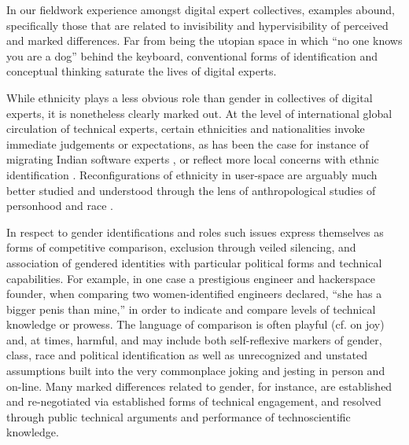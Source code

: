 \documentclass[10pt,letter,oneside]{scrartcl}
\begin{document}
In our fieldwork experience amongst digital expert collectives,
examples abound, specifically those that are related to invisibility
and hypervisibility of perceived and marked differences.  Far from
being the utopian space in which ``no one knows you are a dog'' behind
the keyboard, conventional forms of identification and conceptual thinking
saturate the lives of digital experts. 

While ethnicity plays a less obvious role than gender in collectives
of digital experts, it is nonetheless clearly marked out.  At the
level of international global circulation of technical experts,
certain ethnicities and nationalities invoke immediate judgements or
expectations, as has been the case for instance of migrating Indian software
experts \cite{xiang2007}, or reflect more local concerns with ethnic
identification \cite{Takhteyev2012,Burrell2012,Chan2013}.  Reconfigurations of
ethnicity in user-space are arguably much better studied and understood 
through the lens of anthropological studies of personhood and race \cite{BOELLSTORFF2008,Miller2011,Nakamura2013}.

In respect to gender identifications and roles such issues express 
themselves as forms of competitive comparison, exclusion through veiled 
silencing, and association of gendered identities with particular political 
forms and technical capabilities.  For example, in one case a prestigious 
engineer and hackerspace founder, when comparing two women-identified engineers
declared, ``she has a bigger penis than mine,'' in order to indicate and
compare levels of technical knowledge or prowess.  The language of
comparison is often playful (cf. \cite{Coleman2013} on joy) and, at
times, harmful, and may include both self-reflexive markers of gender,
class, race and political identification as well as unrecognized and
unstated assumptions built into the very commonplace joking and
jesting in person and on-line.  Many marked differences related to
gender, for instance, are established and re-negotiated via
established forms of technical engagement, and resolved through
public technical arguments and performance of technoscientific knowledge.
\end{document}
